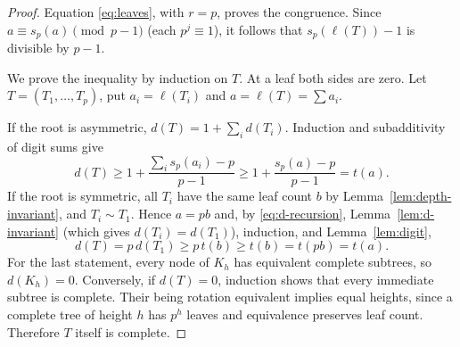 \documentclass[11pt]{amsart}
\theoremstyle{definition}
\theoremstyle{remark}
\begin{document}
\begin{proof}
Equation \eqref{eq:leaves}, with $r=p$, proves the congruence.  Since $a\equiv s_p(a)\pmod{p-1}$ (each $p^j\equiv1$), it follows that $s_p(\ell(T))-1$ is divisible by $p-1$.

We prove the inequality by induction on $T$.  At a leaf both sides are zero.  Let $T=(T_1,\ldots,T_p)$, put $a_i=\ell(T_i)$ and $a=\ell(T)=\sum a_i$.

If the root is asymmetric, $d(T)=1+\sum_id(T_i)$.  Induction and subadditivity of digit sums give
\[
 d(T)\ge1+\frac{\sum_is_p(a_i)-p}{p-1}
 \ge1+\frac{s_p(a)-p}{p-1}=t(a).
\]
If the root is symmetric, all $T_i$ have the same leaf count $b$
by Lemma~\ref{lem:depth-invariant}, and $T_i\sim T_1$.
Hence $a=pb$ and, by \eqref{eq:d-recursion}, Lemma~\ref{lem:d-invariant} (which gives $d(T_i)=d(T_1)$), induction,
and Lemma~\ref{lem:digit},
\[
 d(T)=p\,d(T_1)\ge p\,t(b)\ge t(b)=t(pb)=t(a).
\]
For the last statement, every node of $K_h$ has equivalent complete subtrees, so $d(K_h)=0$.  Conversely, if $d(T)=0$, induction shows that every immediate subtree is complete.  Their being rotation equivalent implies equal heights, since a complete tree of height $h$ has $p^h$ leaves and equivalence preserves leaf count.  Therefore $T$ itself is complete.
\end{proof}
\end{document}
